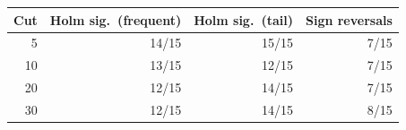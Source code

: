 \begin{tabular}{rrrr}
\toprule
Cut & Holm sig.\ (frequent) & Holm sig.\ (tail) & Sign reversals \\
\midrule
5 & 14/15 & 15/15 & 7/15 \\
10 & 13/15 & 12/15 & 7/15 \\
20 & 12/15 & 14/15 & 7/15 \\
30 & 12/15 & 14/15 & 8/15 \\
\bottomrule
\end{tabular}
